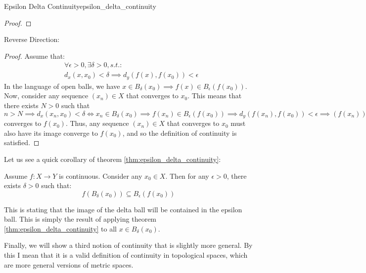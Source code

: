 \begin{thm}{Epsilon Delta Continuity}{epsilon_delta_continuity}
\begin{proof}
\end{proof}

Reverse Direction:
\begin{proof}
Assume that:
\begin{align*}
   &\forall \epsilon > 0, \exists \delta > 0, s.t.:\\
    &d_x(x, x_0) < \delta \implies d_y(f(x), f(x_0)) < \epsilon
\end{align*}
In the language of open balls, we have \(x \in B_\delta(x_0) \implies f(x) \in B_\epsilon(f(x_0))\). Now, consider any sequence \((x_n) \in X\) that converges to \(x_0\). This means that there exists \(N > 0\) such that \(n > N \implies d_x(x_n, x_0) < \delta \iff x_n \in B_\delta(x_0) \implies f(x_n) \in B_\epsilon(f(x_0)) \implies d_y(f(x_n), f(x_0)) < \epsilon \implies (f(x_n))\) converges to \(f(x_0)\). Thus, any sequence \((x_n) \in X\) that converges to \(x_0\) must also have its image converge to \(f(x_0)\), and so the definition of continuity is satisfied.
\end{proof}


\end{thm}

\begin{exmp}{}{}
Let us see a quick corollary of theorem \ref{thm:epsilon_delta_continuity}: \newline 

Assume \(f: X \to Y\) is continuous. Consider any \(x_0 \in X\). Then for any \(\epsilon > 0\), there exists \(\delta > 0\) such that: 
\begin{equation*}
  f(B_\delta(x_0)) \subseteq B_\epsilon(f(x_0))
\end{equation*}

This is stating that the image of the delta ball will be contained in the epsilon ball. This is simply the result of applying theorem \ref{thm:epsilon_delta_continuity} to all \(x \in B_\delta(x_0)\).

\end{exmp}


Finally, we will show a third notion of continuity that is slightly more general. By this I mean that it is a valid definition of continuity in topological spaces, which are more general versions of metric spaces.

